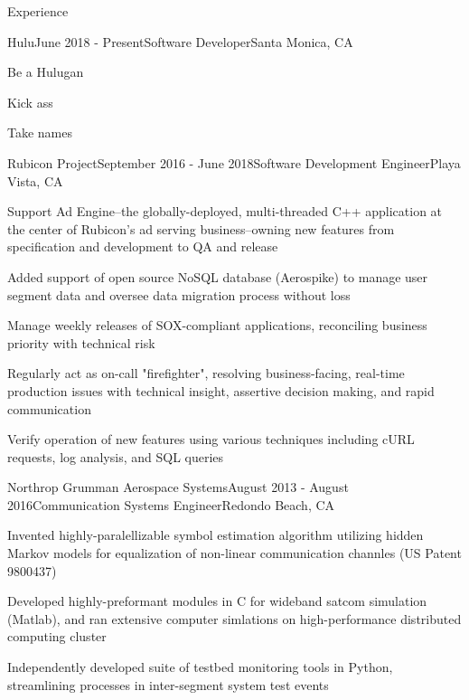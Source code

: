 \documentclass{resume} %
\begin{document}
\begin{rSection}{Experience}

\begin{rSubsection}{Hulu}{June 2018 - Present}{Software Developer}{Santa Monica, CA}
\item Be a Hulugan
\item Kick ass
\item Take names
\end{rSubsection}

\begin{rSubsection}{Rubicon Project}{September 2016 - June 2018}{Software Development Engineer}{Playa Vista, CA}
\item Support Ad Engine--the globally-deployed, multi-threaded C++ application at the center of Rubicon's ad serving business--owning new features from specification and development to QA and release
\item Added support of open source NoSQL database (Aerospike) to manage user segment data and oversee data migration process without loss
\item Manage weekly releases of SOX-compliant applications, reconciling business priority with technical risk
\item Regularly act as on-call "firefighter", resolving business-facing, real-time production issues with technical insight, assertive decision making, and rapid communication
\item Verify operation of new features using various techniques including cURL requests, log analysis, and SQL queries
\end{rSubsection}

\begin{rSubsection}{Northrop Grumman Aerospace Systems}{August 2013 - August 2016}{Communication Systems Engineer}{Redondo Beach, CA}
\item Invented highly-paralellizable symbol estimation algorithm utilizing hidden Markov models for equalization of non-linear communication channles (US Patent 9800437)
\item Developed highly-preformant modules in C for wideband satcom simulation (Matlab), and ran extensive computer simlations on high-performance distributed computing cluster
\item Independently developed suite of testbed monitoring tools in Python, streamlining processes in inter-segment system test events
\end{rSubsection}


\end{rSection}
\end{document}

